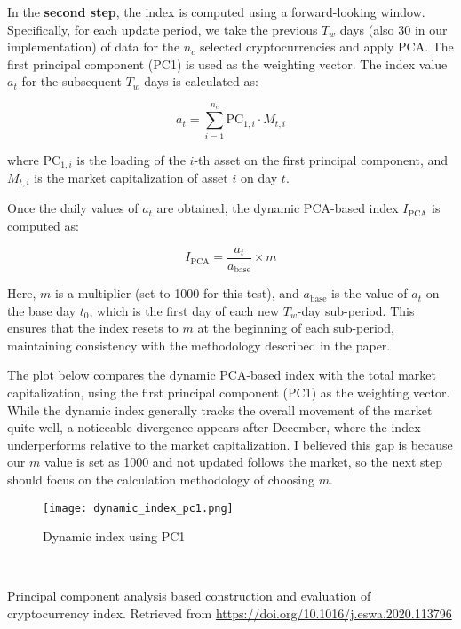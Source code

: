 \documentclass[12pt]{article}
\begin{document}
In the \textbf{second step}, the index is computed using a forward-looking window. Specifically, for each update period, we take the previous \( T_w \) days (also 30 in our implementation) of data for the \( n_c \) selected cryptocurrencies and apply PCA. The first principal component (PC1) is used as the weighting vector. The index value \( a_t \) for the subsequent \( T_w \) days is calculated as:

\[
a_t = \sum_{i=1}^{n_c} \text{PC}_{1,i} \cdot M_{t,i}
\]

where \( \text{PC}_{1,i} \) is the loading of the \( i \)-th asset on the first principal component, and \( M_{t,i} \) is the market capitalization of asset \( i \) on day \( t \).

Once the daily values of \( a_t \) are obtained, the dynamic PCA-based index \( I_{\text{PCA}} \) is computed as:

\[
I_{\text{PCA}} = \frac{a_t}{a_{\text{base}}} \times m
\]

Here, \( m \) is a multiplier (set to 1000 for this test), and \( a_{\text{base}} \) is the value of \( a_t \) on the base day \( t_0 \), which is the first day of each new \( T_w \)-day sub-period. This ensures that the index resets to \( m \) at the beginning of each sub-period, maintaining consistency with the methodology described in the paper.

The plot below compares the dynamic PCA-based index with the total market capitalization, using the first principal component (PC1) as the weighting vector. While the dynamic index generally tracks the overall movement of the market quite well, a noticeable divergence appears after December, where the index underperforms relative to the market capitalization. I believed this gap is because our $m$ value is set as 1000 and not updated follows the market, so the next step should focus on the calculation methodology of choosing $m$.

\begin{figure}[H]
    \centering
    \texttt{[image: dynamic\_index\_pc1.png]}
    \caption{Dynamic index using PC1}
    \label{fig:di1}
\end{figure}

\






\newpage
\begin{thebibliography}{1}
 Principal component analysis based construction and evaluation of cryptocurrency index. Retrieved from \url{https://doi.org/10.1016/j.eswa.2020.113796}
\end{thebibliography}
\end{document}
